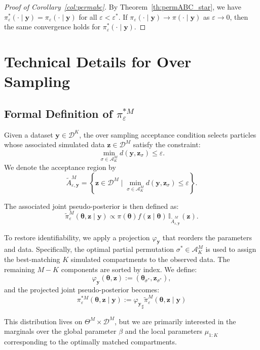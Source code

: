 \documentclass[11pt,a4paper]{article}
\def\dataspace{\mathcal{D}}
\def\globparam{\beta}
\def\locparam{\mu}
\def\obsdata{\mathbf{y}}
\def\param{\boldsymbol{\theta}}
\def\proj{\varphi_{\obsdata}}
\def\simdata{\mathbf{z}}
\def\projsharp{{\varphi_{\mathbf{y}}}_{\sharp}}
\theoremstyle{plain}
\theoremstyle{definition}
\theoremstyle{remark}
\begin{document}
\begin{proof}[Proof of Corollary~\ref{col:permabc}]
By Theorem~\ref{th:permABC_star}, we have $\pi^*_{\varepsilon}(\cdot \mid \obsdata) = \pi_{\varepsilon}(\cdot \mid \obsdata)$ for all $\varepsilon < \varepsilon^*$. If $\pi_{\varepsilon}(\cdot \mid \obsdata) \to \pi(\cdot \mid \obsdata)$ as $\varepsilon \to 0$, then the same convergence holds for $\pi^*_{\varepsilon}(\cdot \mid \obsdata)$.
\end{proof}

\section{Technical Details for Over Sampling}
\label{appendix_os}

\subsection{Formal Definition of \( \pi^{*M}_\varepsilon \)}

Given a dataset \( \obsdata \in \dataspace^K \), the over sampling acceptance condition selects particles whose associated simulated data \( \simdata \in \dataspace^M \) satisfy the constraint:
\[
\min_{\sigma \in \mathcal A_K^M} d(\obsdata, \simdata_\sigma) \leq \varepsilon.
\]
We denote the acceptance region by
\[
\tilde A_{\varepsilon, \obsdata}^{M} = \left\{ \simdata \in \dataspace^M \mid \min_{\sigma \in \mathcal A_K^M} d(\obsdata, \simdata_\sigma) \leq \varepsilon \right\}.
\]

The associated joint pseudo-posterior is then defined as:
\[
\tilde{\pi}_\varepsilon^M(\param, \simdata \mid \obsdata) \propto \pi(\param) f(\simdata \mid \param) \, \mathbb{I}_{\tilde A_{\varepsilon, \obsdata}^{M}}(\simdata).
\]

To restore identifiability, we apply a projection \( \proj \) that reorders the parameters and data. Specifically, the optimal partial permutation \( \sigma^* \in \mathcal A_K^M \) is used to assign the best-matching \( K \) simulated compartments to the observed data. The remaining \( M - K \) components are sorted by index. We define:
\[
\proj(\param, \simdata) := (\param_{\sigma^*}, \simdata_{\sigma^*}),
\]
and the projected joint pseudo-posterior becomes:
\[
\pi^{*M}_{\varepsilon}(\param, \simdata \mid \obsdata)
:= \projsharp \tilde{\pi}_{\varepsilon}^{M}(\param, \simdata \mid \obsdata)
\]

This distribution lives on \( \Theta^M \times \dataspace^M \), but we are primarily interested in the marginals over the global parameter \( \globparam \) and the local parameters \( \locparam_{1:K} \) corresponding to the optimally matched compartments.
\end{document}

